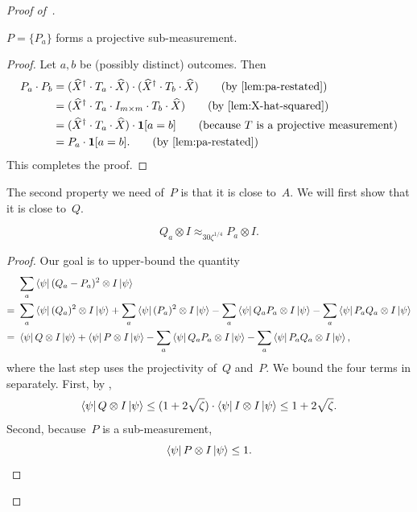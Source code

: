 \begin{proof}[Proof of~]
\begin{lemma}[Projectivity of~$P$]\label{lem:P-projectivity}
$P = \{P_a\}$ forms a projective sub-measurement.
\end{lemma}
\begin{proof}
Let $a, b$ be (possibly distinct) outcomes.
Then
\begin{align*}
P_a \cdot P_b
&= (\widehat{X}^\dagger \cdot T_a \cdot \widehat{X})
	\cdot (\widehat{X}^\dagger \cdot T_b \cdot \widehat{X}) \tag{by \Cref{lem:pa-restated}}\\
&= (\widehat{X}^\dagger \cdot T_a \cdot I_{m \times m} \cdot T_b \cdot \widehat{X}) \tag{by \Cref{lem:X-hat-squared}}\\
&= (\widehat{X}^\dagger \cdot T_a  \cdot \widehat{X}) \cdot \bone[a = b] \tag{because~$T$ is a projective measurement}\\
&= P_a  \cdot \bone[a=b]. \tag{by \Cref{lem:pa-restated}}
\end{align*}
This completes the proof.
\end{proof}

The second property we need of~$P$ is that it is close to~$A$.
We will first show that it is close to~$Q$.

\begin{lemma}[$P$ is close to~$Q$]\label{lem:P-Q-approx}
\begin{equation*}
Q_a \otimes I \approx_{30\zeta^{1/4}} P_a \otimes I.
\end{equation*}
\end{lemma}
\begin{proof}
Our goal is to upper-bound the quantity
\begin{align}
&\sum_a \bra{\psi} (Q_a - P_a)^2 \otimes I \ket{\psi}\nonumber\\
=~& \sum_a \bra{\psi} (Q_a)^2 \otimes I \ket{\psi} + \sum_a \bra{\psi} (P_a)^2 \otimes I \ket{\psi} - \sum_a \bra{\psi} Q_a P_a \otimes I \ket{\psi}
	- \sum_a \bra{\psi} P_a Q_a \otimes I \ket{\psi}\nonumber\\
=~& \bra{\psi} Q \otimes I \ket{\psi} +  \bra{\psi} P\otimes I \ket{\psi} - \sum_a \bra{\psi} Q_a P_a \otimes I \ket{\psi}
	- \sum_a \bra{\psi} P_a Q_a \otimes I \ket{\psi},\label{eq:P-Q-thing-to-bound}
\end{align}
where the last step uses the projectivity of~$Q$ and~$P$.
We bound the four terms in  separately.
First, by ,
\begin{equation*}
 \bra{\psi} Q \otimes I \ket{\psi}
 \leq (1+2\sqrt{\zeta}) \cdot \bra{\psi} I \otimes I \ket{\psi} \leq 1+2\sqrt{\zeta}.
\end{equation*}
Second, because~$P$ is a sub-measurement,
\begin{equation*}
\bra{\psi} P \otimes I\ket{\psi} \leq 1.
\end{equation*}


\end{proof}
\end{proof}
